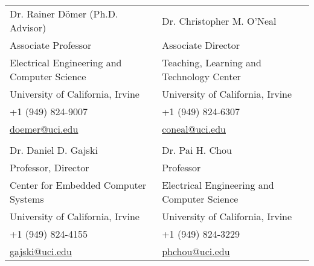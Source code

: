 


{\begin{tabular*}{6.5in}{l@{\extracolsep{\fill}}l}
Dr. Rainer D\"{o}mer (Ph.D. Advisor) 					&	Dr. Christopher M. O'Neal \\
Associate Professor									&	Associate Director \\
Electrical Engineering and Computer Science				&	Teaching, Learning and Technology Center\\
University of California, Irvine							&	University of California, Irvine\\
+1 (949) 824-9007									&	+1 (949) 824-6307\\
\href{mailto:doemer@uci.edu}{doemer@uci.edu}			& 	\href{mailto:coneal@uci.edu}{coneal@uci.edu}\\
&\\

Dr. Daniel D. Gajski 									&	Dr. Pai H. Chou						\\
Professor, Director									&	Professor \\
Center for Embedded Computer Systems					&	Electrical Engineering and Computer Science \\
University of California, Irvine							&	University of California, Irvine\\
+1 (949) 824-4155									&	+1 (949) 824-3229\\
\href{mailto:gajski@uci.edu}{gajski@uci.edu}				&	\href{mailto:phchou@uci.edu}{phchou@uci.edu}\\

\end{tabular*}}
\\

